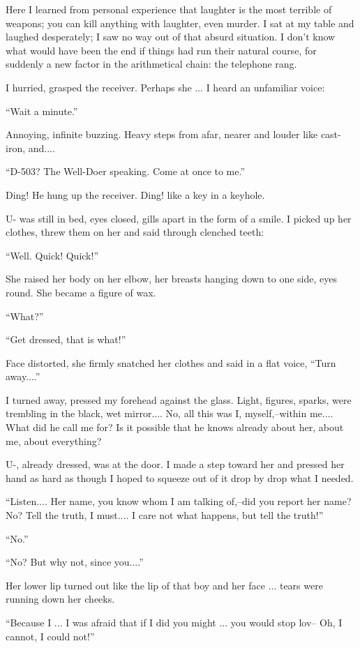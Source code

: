 \documentclass[11pt,openany]{book}
\begin{document}
Here I learned from personal experience that laughter is the most terrible of weapons; you can kill anything with laughter, even murder. I sat at my table and laughed desperately; I saw no way out of that absurd situation. I don't know what would have been the end if things had run their natural course, for suddenly a new factor in the arithmetical chain: the telephone rang.

I hurried, grasped the receiver. Perhaps she ... I heard an unfamiliar voice:

``Wait a minute.''

Annoying, infinite buzzing. Heavy steps from afar, nearer and louder like cast-iron, and....

``D-503? The Well-Doer speaking. Come at once to me.''

Ding! He hung up the receiver. Ding! like a key in a keyhole.

U- was still in bed, eyes closed, gills apart in the form of a smile. I picked up her clothes, threw them on her and said through clenched teeth:

``Well. Quick! Quick!''

She raised her body on her elbow, her breasts hanging down to one side, eyes round. She became a figure of wax.

``What?''

``Get dressed, that is what!''

Face distorted, she firmly snatched her clothes and said in a flat voice, ``Turn away....''

I turned away, pressed my forehead against the glass. Light, figures, sparks, were trembling in the black, wet mirror.... No, all this was I, myself,--within me.... What did he call me for? Is it possible that he knows already about her, about me, about everything?

U-, already dressed, was at the door. I made a step toward her and pressed her hand as hard as though I hoped to squeeze out of it drop by drop what I needed.

``Listen.... Her name, you know whom I am talking of,--did you report her name? No? Tell the truth, I must.... I care not what happens, but tell the truth!''

``No.''

``No? But why not, since you....''

Her lower lip turned out like the lip of that boy and her face ... tears were running down her cheeks.

``Because I ... I was afraid that if I did you might ... you would stop lov-- Oh, I cannot, I could not!''
\end{document}
